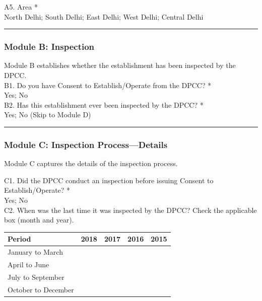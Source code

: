 \documentclass[a4paper, 12pt]{article}
\begin{document}
\begin{mdframed}[backgroundcolor=gray!20]
\begin{spacing}{0.5}
		{A5. Area *} \\
		
		North Delhi; South Delhi; East Delhi; West Delhi; Central Delhi \\
		
		\hrule
		
		\subsubsection*{Module B: Inspection} 	
					
		
		Module B establishes whether the establishment has been inspected by the DPCC. \\
		
		{B1. Do you have Consent to Establish/Operate from the DPCC? *} \\
		
		Yes; No \\
		
		{B2. Has this establishment ever been inspected by the DPCC? *} \\
		
		Yes; No (Skip to Module D) \\	
		\hrule
		
		\subsubsection*{Module C: Inspection Process—Details} 
		
		Module C captures the details of the inspection process.
		
		{C1. Did the DPCC conduct an inspection before issuing Consent to Establish/Operate? *} \\
		
		Yes; No \\
		
		{C2. When was the last time it was inspected by the DPCC?} Check the applicable box (month and year).	
	
		
		\begin{tabular}{lrrrr}
		\toprule
		Period & 2018 & 2017 & 2016 & 2015\\
		\midrule
		January to March &  &  &  & \\
		April to June &  &  &  & \\
		July to September &  &  &  & \\
		October to December &  &  &  & \\
		\end{tabular}
		

\end{spacing}
\end{mdframed}
\end{document}
